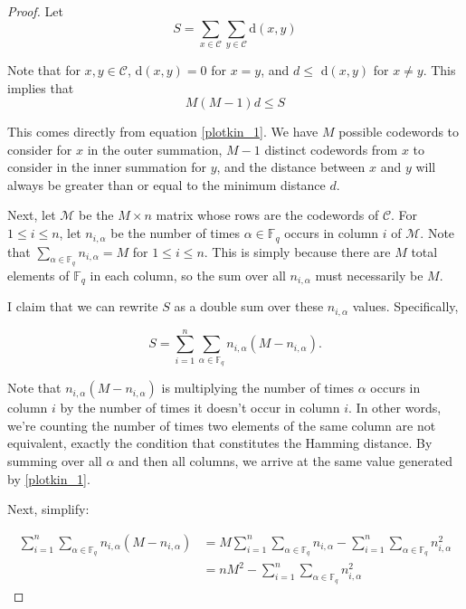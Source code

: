 \documentclass{article}
\numberwithin{theorem}{subsection}
\numberwithin{lemma}{subsection}
\theoremstyle{definition}
\numberwithin{exmp}{subsection}
\theoremstyle{definition}
\numberwithin{defn}{subsection}
\theoremstyle{definition}
\numberwithin{claim}{subsection}
\begin{document}
\begin{proof}
Let 
\begin{equation} \label{plotkin_1}
S = \sum_{x \in \mathcal{C}} \sum_{y \in \mathcal{C}} \text{d}(x,y)
\end{equation}

Note that for $x,y \in \mathcal{C}$, d$(x,y)=0$ for $x=y$, and $d \le$ d$(x,y)$ for $x\neq y$.  This implies that
\begin{equation} \label{plotkin_1_5}
M(M-1)d\le S
\end{equation}

This comes directly from equation \ref{plotkin_1}.  We have $M$ possible codewords to consider for $x$ in the outer summation, $M-1$ distinct codewords from $x$ to consider in the inner summation for $y$, 
and the distance between $x$ and $y$ will always be greater than or equal to the minimum distance $d$.

Next, let $\mathcal{M}$ be the $M \times n$ matrix whose rows are the codewords of $\mathcal{C}$.  For $1 \le i \le n$, let $n_{i,\alpha}$ be the number of times $\alpha \in
 \mathbb{F}_q$ occurs in column $i$ of $\mathcal{M}$.  Note that $\sum_{\alpha \in \mathbb{F}_q} n_{i,\alpha} = M$ for $1\le i \le n$.  This is simply because there are $M$ total
 elements of $\mathbb{F}_q$ in each column, so the sum over all $n_{i,\alpha}$ must necessarily be $M$.  

I claim that we can rewrite $S$ as a double sum over these $n_{i,\alpha}$ values.  Specifically,

\begin{equation}
S = \sum_{i=1}^{n} \sum_{\alpha\in\mathbb{F}_q} n_{i,\alpha}(M - n_{i,\alpha}).
\end{equation}

Note that $n_{i,\alpha}(M - n_{i,\alpha})$ is multiplying the number of times $\alpha$ occurs in column $i$ by the number of times it doesn't occur in column $i$.  In other words, we're counting the number of times two elements of the same
column are not equivalent, exactly the condition that constitutes the Hamming distance.   By summing over all $\alpha$ and then all columns, we arrive at the same value generated by \ref{plotkin_1}.

Next, simplify:

\begin{equation}
\begin{split}
\sum_{i=1}^{n} \sum_{\alpha\in\mathbb{F}_q} n_{i,\alpha}(M - n_{i,\alpha}) &= M\sum_{i=1}^{n} \sum_{\alpha\in\mathbb{F}_q} n_{i,\alpha} - \sum_{i=1}^{n} \sum_{\alpha\in\mathbb{F}_q} n_{i,\alpha}^2 \\
&= nM^2 - \sum_{i=1}^{n} \sum_{\alpha\in\mathbb{F}_q} n_{i,\alpha}^2
\end{split}
\end{equation}


\end{proof}
\end{document}
